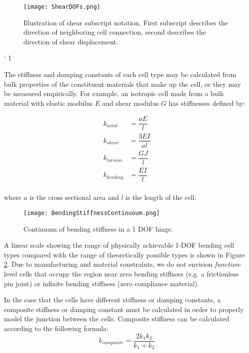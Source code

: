 {\begin{figure}
  \texttt{[image: ShearDOFs.png]}
  \caption{Illustration of shear subscript notation.  First subscript describes the direction of neighboring cell connection, second describes the direction of shear displacement.}
  \label{fig:ShearDOFs}
\end{figure}`	1

The stiffness and damping constants of each cell type may be calculated from bulk properties of the constituent materials that make up the cell, or they may be measured empirically.  For example, an isotropic cell made from a bulk material with elastic modulus $E$ and shear modulus $G$ has stiffnesses defined by:

\begin{subequations}
\begin{align} 
\label{eq:kaxial}
k_{axial} &= \dfrac{aE}{l}\\[10pt]
\label{eq:kshear}
k_{shear} &= \dfrac{3EI}{al}\\[10pt]
\label{eq:ktorsion}
k_{torsion} &= \dfrac{GJ}{l}\\[10pt]
\label{eq:kbending}
k_{bending} &= \dfrac{EI}{l}
\end{align}
\end{subequations}
\\
where $a$ is the cross sectional area and $l$ is the length of the cell.\\

\begin{figure}
  \texttt{[image: BendingStiffnessContinuoum.png]}
  \caption{Continuum of bending stiffness in a 1 DOF hinge.}
  \label{fig:BendingStiffnessContinuoum}
\end{figure}

A linear scale showing the range of physically achievable 1-DOF bending cell types compared with the range of theoretically possible types is shown in Figure \ref{fig:BendingStiffnessContinuoum}.  Due to manufacturing and material constraints, we do not envision \textit{function}-level cells that occupy the region near zero bending stiffness (e.g. a frictionless pin joint) or infinite bending stiffness (zero compliance material).

In the case that the cells have different stiffness or damping constants, a composite stiffness or damping constant must be calculated in order to properly model the junction between the cells.  Composite stiffness can be calculated according to the following formula:
 \begin{equation} \label{eq:springseries}
 k_{composite} = \dfrac{2k_1k_2}{k_1+k_2}
 \end{equation}

}

